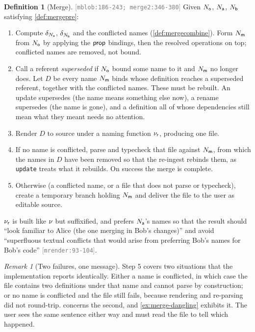 \documentclass[11pt]{article}
\theoremstyle{definition}
\newtheorem{definition}{Definition}[section]
\theoremstyle{plain}
\theoremstyle{remark}
\newtheorem{remark}{Remark}[section]
\newcommand{\src}[1]{{\footnotesize\textcolor{gray}{[\texttt{#1}]}}}
\begin{document}
\begin{definition}[Merge]\label{def:umerge}
\src{mblob:186-243; merge2:346-380} Given $N_{\mathsf{o}}$, $N_{\mathsf{a}}$, $N_{\mathsf{b}}$ satisfying \cref{def:mergepre}:
\begin{enumerate}[nosep,label=\arabic*.]
  \item Compute $\delta_{N_{\mathsf{a}}}$, $\delta_{N_{\mathsf{b}}}$ and the conflicted names (\cref{def:mergecombine}).
        Form $N_{\mathsf{m}}$ from $N_{\mathsf{o}}$ by applying the $\mathsf{prop}$ bindings, then the resolved operations on top;
        conflicted names are removed, not bound.
  \item Call a referent \emph{superseded} if $N_{\mathsf{o}}$ bound some name to it and $N_{\mathsf{m}}$ no longer does.
        Let $D$ be every name $N_{\mathsf{m}}$ binds whose definition reaches a superseded referent, together
        with the conflicted names. These must be rebuilt. An update supersedes (the name means
        something else now), a rename supersedes (the name is gone), and a definition all of whose
        dependencies still mean what they meant needs no attention.
  \item Render $D$ to source under a naming function $\nu_{\mathsf{r}}$, producing one file.
  \item If no name is conflicted, parse and typecheck that file against $N_{\mathsf{m}}$, from which the names
        in $D$ have been removed so that the re-ingest rebinds them, as \texttt{update} treats what
        it rebuilds. On success the merge is complete.
  \item Otherwise (a conflicted name, or a file that does not parse or typecheck), create a
        temporary branch holding $N_{\mathsf{m}}$ and deliver the file to the user as editable source.
\end{enumerate}
$\nu_{\mathsf{r}}$ is built like $\nu$ but suffixified, and prefers $N_{\mathsf{a}}$'s names so that the result should
``look familiar to Alice (the one merging in Bob's changes)'' and avoid ``superfluous textual
conflicts that would arise from preferring Bob's names for Bob's code'' \src{mrender:93-104}.
\end{definition}

\begin{remark}[Two failures, one message]\label{rem:merge-twofail}
Step 5 covers two situations that the implementation reports identically. Either a name is
conflicted, in which case the file contains two definitions under that name and cannot parse by
construction; or no name is conflicted and the file still fails, because rendering and re-parsing did
not round-trip.  concerns the second, and \cref{ex:merge-dangling}
exhibits it. The user sees the same sentence either way and must read the file to tell which happened.
\end{remark}
\end{document}
